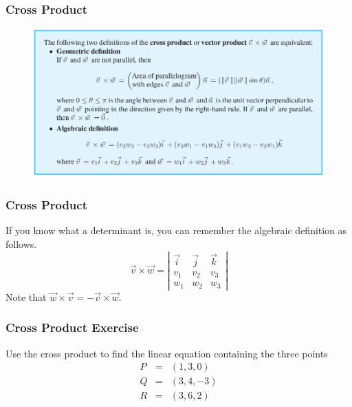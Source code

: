 \documentclass[xcolor=dvipsnames]{beamer}
\begin{document}
\begin{frame}
  \frametitle{Cross Product}
  \begin{figure}[h]
    \includegraphics[scale=0.32]{./diagrams/crossproduct.png}
  \end{figure}
\end{frame}

\begin{frame}
  \frametitle{Cross Product}
  If you know what a determinant is, you can remember the algebraic
  definition as follows.
  \begin{equation}
    \label{eq:abeekohc}
    \vec{v}\times\vec{w}=\left\vert
      \begin{array}{ccc}
        \vec{i} & \vec{j} & \vec{k} \\
        v_{1} & v_{2} & v_{3} \\
        w_{1} & w_{2} & w_{3}
      \end{array}\right\vert
  \end{equation}
  Note that $\vec{w}\times\vec{v}=-\vec{v}\times\vec{w}$.
\end{frame}

\begin{frame}
  \frametitle{Cross Product Exercise}
  {\ubung} Use the cross product to find the linear equation containing the
  three points
  \begin{equation}
    \label{eq:eiyeigaz}
    \begin{array}{rcl}
      P&=&(1,3,0) \\
      Q&=&(3,4,-3) \\
      R&=&(3,6,2)
    \end{array}
  \end{equation}
\end{frame}
\end{document}

